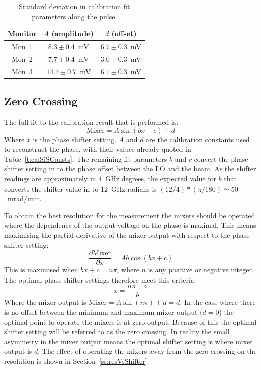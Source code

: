 \begin{table}
  \begin{center}
    \begin{tabular}{|c c c|}
	   \hline
       Monitor & \(A\) (amplitude) & \(d\) (offset) \\ \hline
       Mon~1 & \(8.3\pm0.4\)~mV & \(6.7\pm0.3\)~mV \\ 
       Mon~2 & \(7.7\pm0.4\)~mV & \(3.0\pm0.3\)~mV\\
       Mon~3 & \(14.7\pm0.7\)~mV & \(6.1\pm0.3\)~mV\\ \hline
    \end{tabular}
    \caption{Standard deviation in calibration fit parameters along the pulse.}
  	\label{t:calConstsStdAlong}
  \end{center}
\end{table}

\subsection{Zero Crossing}
\label{ss:calZeroCross}

The full fit to the calibration result that is performed is:
\begin{equation}
\mathrm{Mixer} = A\sin(bx + c) + d
\end{equation}
Where \(x\) is the phase shifter setting. \(A\) and \(d\) are the calibration constants used to reconstruct the phase, with their values already quoted in Table~\ref{t:calSiSConsts}. The remaining fit parameters \(b\) and \(c\) convert the phase shifter setting in to the phase offset between the LO and the beam. As the shifter readings are approximately in 4~GHz degrees, the expected value for \(b\) that converts the shifter value in to 12~GHz radians is \((12/4)*(\pi/180) \simeq 50\)~mrad/unit.

To obtain the best resolution for the measurement the mixers should be operated where the dependence of the output voltage on the phase is maximal. This means maximising the partial derivative of the mixer output with respect to the phase shifter setting:
\begin{equation}
\frac{\partial \mathrm{Mixer}}{\partial x} = Ab\cos(bx+c)
\end{equation}
This is maximised when \(bx + c = n\pi\), where \(n\) is any positive or negative integer. The optimal phase shifter settings therefore meet this criteria:
\begin{equation}
x = \frac{n\pi-c}{b}
\end{equation}
Where the mixer output is \(\mathrm{Mixer} = A\sin(n\pi)+d = d\). In the case where there is no offset between the minimum and maximum mixer output (\(d=0\)) the optimal point to operate the mixers is at zero output. Because of this the optimal shifter setting will be referred to as the zero crossing. In reality the small asymmetry in the mixer output means the optimal shifter setting is where mixer output is \(d\). The effect of operating the mixers away from the zero crossing on the resolution is shown in Section~\ref{ss:resVsShifter}.

